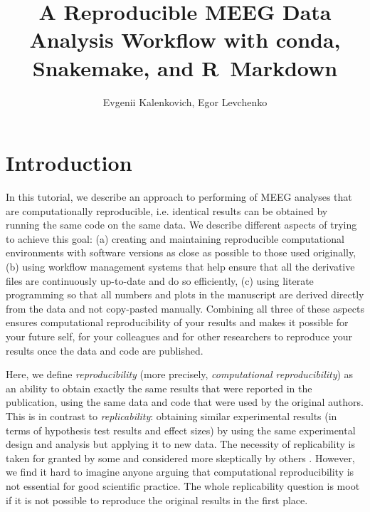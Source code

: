 \documentclass[a4paper,man,floatsintext,natbib]{apa6}
\title{A Reproducible MEEG Data Analysis Workflow with conda, Snakemake, and R~Markdown}
\author{Evgenii Kalenkovich, Egor Levchenko}
\affiliation{HSE University}
\begin{document}
\maketitle

\section{Introduction}
In this tutorial, we describe an approach to performing of MEEG analyses that are computationally reproducible, i.e. identical results can be obtained by running the same code on the same data.
We describe different aspects of trying to achieve this goal:
(a) creating and maintaining reproducible computational environments with software versions as close as possible to those used originally,
(b) using workflow management systems that help ensure that all the derivative files are continuously up-to-date and do so efficiently,
(c) using literate programming so that all numbers and plots in the manuscript are derived directly from the data and not copy-pasted manually.
Combining all three of these aspects ensures computational reproducibility of your results and makes it possible for your future self, for your colleagues and for other researchers to reproduce your results once the data and code are published.

Here, we define \emph{reproducibility} (more precisely, \emph{computational reproducibility}) as an ability to obtain exactly the same results that were reported in the publication, using the same data and code that were used by the original authors. 
This is in contrast to \emph{replicability}: obtaining similar experimental results (in terms of hypothesis test results and effect sizes) by using the same experimental design and analysis but applying it to new data.
The necessity of replicability is taken for granted by some \citep{pashlerReplicabilityCrisisOverblown2012a,opensciencecollaborationEstimatingReproducibilityPsychological2015} and considered more skeptically by others \citep{devezerCaseFormalMethodology2021}.
However, we find it hard to imagine anyone arguing that computational reproducibility is not essential for good scientific practice. The whole replicability question is moot if it is not possible to reproduce the original results in the first place.
\end{document}
